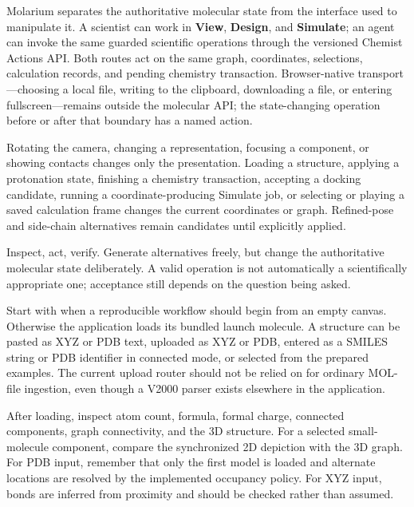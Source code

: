 \documentclass[11pt]{article}
\begin{document}

Molarium separates the authoritative molecular state from the interface used to manipulate it. A scientist can work in \textbf{View}, \textbf{Design}, and \textbf{Simulate}; an agent can invoke the same guarded scientific operations through the versioned Chemist Actions API. Both routes act on the same graph, coordinates, selections, calculation records, and pending chemistry transaction. Browser-native transport---choosing a local file, writing to the clipboard, downloading a file, or entering fullscreen---remains outside the molecular API; the state-changing operation before or after that boundary has a named action.

Rotating the camera, changing a representation, focusing a component, or showing contacts changes only the presentation. Loading a structure, applying a protonation state, finishing a chemistry transaction, accepting a docking candidate, running a coordinate-producing Simulate job, or selecting or playing a saved calculation frame changes the current coordinates or graph. Refined-pose and side-chain alternatives remain candidates until explicitly applied.

Inspect, act, verify. Generate alternatives freely, but change the authoritative molecular state deliberately. A valid operation is not automatically a scientifically appropriate one; acceptance still depends on the question being asked.


Start with  when a reproducible workflow should begin from an empty canvas. Otherwise the application loads its bundled launch molecule. A structure can be pasted as XYZ or PDB text, uploaded as XYZ or PDB, entered as a SMILES string or PDB identifier in connected mode, or selected from the prepared examples. The current upload router should not be relied on for ordinary MOL-file ingestion, even though a V2000 parser exists elsewhere in the application.

After loading, inspect atom count, formula, formal charge, connected components, graph connectivity, and the 3D structure. For a selected small-molecule component, compare the synchronized 2D depiction with the 3D graph. For PDB input, remember that only the first model is loaded and alternate locations are resolved by the implemented occupancy policy. For XYZ input, bonds are inferred from proximity and should be checked rather than assumed.
\end{document}
